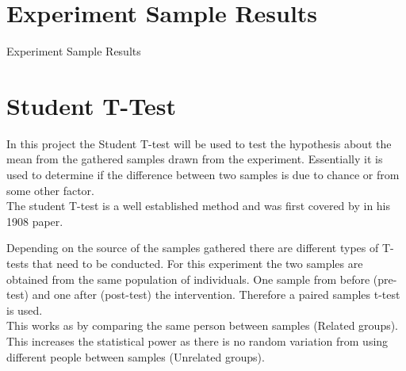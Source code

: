 \documentclass{report}
\begin{document}
\section{Experiment Sample Results}

\begin{center}
Experiment Sample Results\\
\end{center}

\section{Student T-Test}

In this project the Student T-test will be used to test the hypothesis about the mean from the gathered samples drawn from the experiment. Essentially it is used
to determine if the difference between two samples is due to chance or from some other factor.\\
The student T-test is a well established method and was first covered by \citep{student1908probable} in his 1908 paper.

Depending on the source of the samples gathered there are different types of T-tests that need to be conducted. For this experiment the two samples are obtained from 
the same population of individuals. One sample from before (pre-test) and one after (post-test) the intervention. Therefore a paired samples t-test is used.\\
This works as by comparing the same person between samples (Related groups). This increases the statistical power as there is no random variation from using different people between samples (Unrelated groups).
\end{document}

